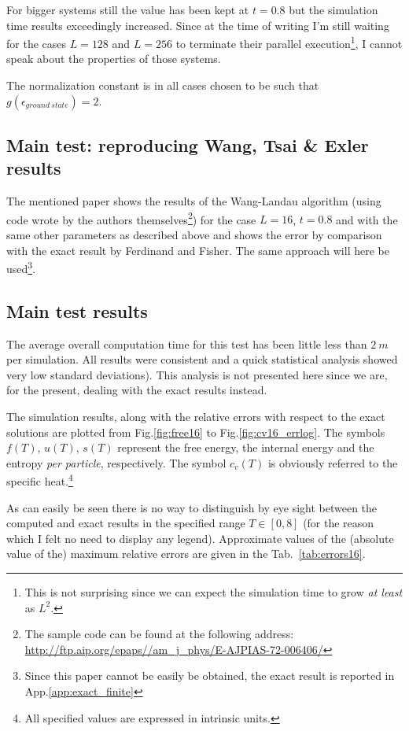 \documentclass[11pt]{article}
\newcommand{\figname}{Fig.}
\newcommand{\tabname}{Tab.~}
\newcommand{\appname}{App.}
\begin{document}
For bigger systems still the value has been kept at $t=0.8$ but the simulation time results exceedingly increased. Since at the time of writing I'm still waiting for the cases $L=128$ and $L=256$ to terminate their parallel execution\footnote{This is not surprising since we can expect the simulation time to grow {\em at least} as $L^2$.}, I cannot speak about the properties of those systems.

The normalization constant is in all cases chosen to be such that $g(\epsilon_{ground~state}) = 2$.

\subsection{Main test: reproducing Wang, Tsai \& Exler results}

The mentioned paper shows the results of the Wang-Landau algorithm (using code wrote by the authors themselves\footnote{The sample code can be found at the following address: \url{http://ftp.aip.org/epaps//am_j_phys/E-AJPIAS-72-006406/}}) for the case $L=16$, $t=0.8$ and with the same other parameters as described above and shows the error by comparison with the exact result by Ferdinand and Fisher\cite{bib:exact}. The same approach will here be used\footnote{Since this paper cannot be easily be obtained, the exact result is reported in \appname \ref{app:exact_finite}}.


\subsection{Main test results}

The average overall computation time for this test has been little less than $2~m$ per simulation. All results were consistent and a quick statistical analysis showed very low standard deviations). This analysis is not presented here since we are, for the present, dealing with the exact results instead.

The simulation results, along with the relative errors with respect to the exact solutions are plotted from \figname \ref{fig:free16} to \figname \ref{fig:cv16_errlog}. The symbols $f(T)$, $u(T)$, $s(T)$ represent the free energy, the internal energy and the entropy {\em per particle}, respectively. The symbol $c_v(T)$ is obviously referred to the specific heat.\footnote{All specified values are expressed in intrinsic units.}

As can easily be seen there is no way to distinguish by eye sight between the computed and exact results in the specified range $T\in[0,8]$ (for the reason which I felt no need to display any legend). Approximate values of the (absolute value of the) maximum relative errors are given in the \tabname \ref{tab:errors16}.
\end{document}
